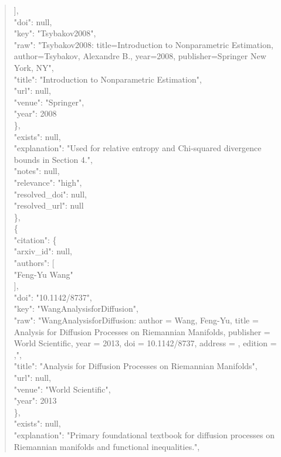 \documentclass[11pt]{article}
\begin{document}
\begin{quote}
        ],\\
        "doi": null,\\
        "key": "Tsybakov2008",\\
        "raw": "Tsybakov2008: title=Introduction to Nonparametric Estimation, author=Tsybakov, Alexandre B., year=2008, publisher=Springer New York, NY",\\
        "title": "Introduction to Nonparametric Estimation",\\
        "url": null,\\
        "venue": "Springer",\\
        "year": 2008\\
      \},\\
      "exists": null,\\
      "explanation": "Used for relative entropy and Chi-squared divergence bounds in Section 4.",\\
      "notes": null,\\
      "relevance": "high",\\
      "resolved\_doi": null,\\
      "resolved\_url": null\\
    \},\\
    \{\\
      "citation": \{\\
        "arxiv\_id": null,\\
        "authors": [\\
          "Feng-Yu Wang"\\
        ],\\
        "doi": "10.1142/8737",\\
        "key": "WangAnalysisforDiffusion",\\
        "raw": "WangAnalysisforDiffusion: author = Wang, Feng-Yu, title = Analysis for Diffusion Processes on Riemannian Manifolds, publisher = World Scientific, year = 2013, doi = 10.1142/8737, address = , edition = ,",\\
        "title": "Analysis for Diffusion Processes on Riemannian Manifolds",\\
        "url": null,\\
        "venue": "World Scientific",\\
        "year": 2013\\
      \},\\
      "exists": null,\\
      "explanation": "Primary foundational textbook for diffusion processes on Riemannian manifolds and functional inequalities.",\\

\end{quote}
\end{document}
